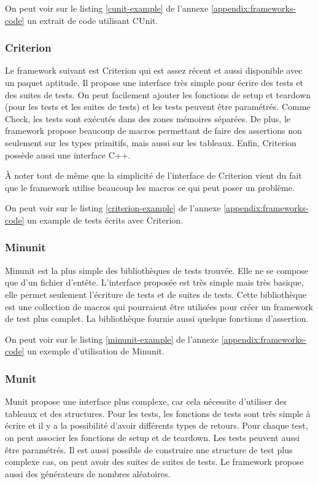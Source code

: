 \documentclass[a4paper]{article}
\begin{document}
On peut voir sur le listing \ref{cunit-example} de l'annexe
\ref{appendix:frameworks-code} un extrait de code utilisant CUnit.

\subsubsection*{Criterion}

Le framework suivant est Criterion qui est assez récent et aussi disponible avec
un paquet aptitude. Il propose une interface très simple pour écrire des tests
et des suites de tests. On peut facilement ajouter les fonctions de setup et
teardown (pour les tests et les suites de tests) et les tests peuvent être
paramétrés. Comme Check, les tests sont exécutés dans des zones mémoires
séparées. De plus, le framework propose beaucoup de macros permettant de faire
des assertions non seulement sur les types primitifs, mais aussi sur les
tableaux. Enfin, Criterion possède aussi une interface C++.

À noter tout de même que la simplicité de l'interface de Criterion vient du fait
que le framework utilise beaucoup les macros ce qui peut poser un problème.

On peut voir sur le listing \ref{criterion-example} de l'annexe
\ref{appendix:frameworks-code} un example de tests écrits avec Criterion.

\subsubsection*{Minunit}

Minunit est la plus simple des bibliothèques de tests trouvée. Elle ne se
compose que d'un fichier d'entête. L'interface proposée est très simple mais
très basique, elle permet seulement l'écriture de tests et de suites de tests.
Cette bibliothèque est une collection de macros qui pourraient être utilisées
pour créer un framework de test plus complet. La bibliothèque fournie aussi
quelque fonctions d'assertion.

On peut voir sur le listing \ref{minunit-example} de l'annexe
\ref{appendix:frameworks-code} un exemple d'utilisation de Minunit.

\subsubsection*{Munit}

Munit propose une interface plus complexe, car cela nécessite d'utiliser des
tableaux et des structures. Pour les tests, les fonctions de tests sont très
simple à écrire et il y a la possibilité d'avoir différents types de retours.
Pour chaque test, on peut associer les fonctions de setup et de teardown. Les
tests peuvent aussi être paramétrés. Il est aussi possible de construire une
structure de test plus complexe cas, on peut avoir des suites de suites de tests.
Le framework propose aussi des générateurs de nombres aléatoires.
\end{document}
